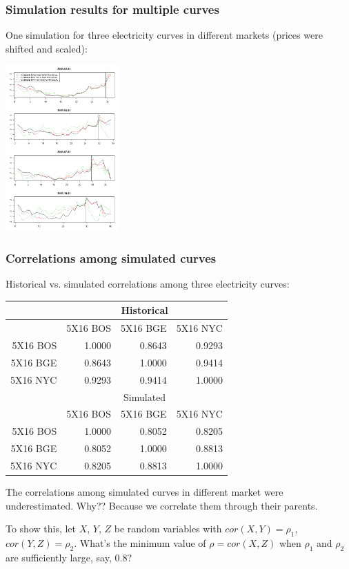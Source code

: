 \documentclass[10pt]{beamer}
\begin{document}
\frame
{
  \frametitle{Simulation results for multiple curves}
One simulation for three electricity curves in different markets 
(prices were shifted and scaled):
\begin{center}
  \includegraphics[height=2.5in]{figures/elec-multicurve.png}
\end{center}

}

\frame
{
  \frametitle{Correlations among simulated curves}
Historical vs. simulated correlations among three electricity curves:
\begin{table}[htbp]
\begin{center}
\begin{tabular}{rrrr}
\hline
 &  \multicolumn{3}{c}{Historical} \\  \hline
 &  5X16 BOS  &  5X16 BGE  &  5X16 NYC  \\
  \hline
 5X16 BOS  & 1.0000 & 0.8643 & 0.9293  \\
   5X16 BGE  & 0.8643 & 1.0000 & 0.9414  \\
   5X16 NYC  & 0.9293 & 0.9414 & 1.0000  \\
   \hline \hline
  & \multicolumn{3}{c}{Simulated} \\ \hline
   &  5X16 BOS  &  5X16 BGE  &  5X16 NYC  \\
  5X16 BOS & 1.0000 & 0.8052 & 0.8205 \\
  5X16 BGE & 0.8052 & 1.0000 & 0.8813 \\
  5X16 NYC  & 0.8205 & 0.8813 & 1.0000 \\ \hline
\end{tabular}
\end{center}
\label{tbl-elec-cor}
\end{table}
}

\frame
{
The correlations among simulated curves in different market
were underestimated. Why??
Because we correlate them through their parents.

\vspace{20pt}
To show this, let $X$, $Y$, $Z$ be random variables with
$cor(X,Y)=\rho_1$, $cor(Y,Z)=\rho_2$.
What's the minimum value of $\rho=cor(X,Z)$ 
when $\rho_1$ and $\rho_2$ are sufficiently large, say, 0.8?
}
\end{document}
